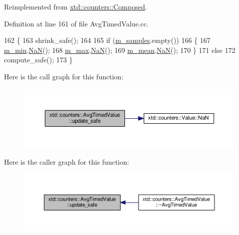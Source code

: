 Reimplemented from \hyperlink{classxtd_1_1counters_1_1Composed_ab6c13e603340cd00da4edc968d747c4d}{xtd\+::counters\+::\+Composed}.



Definition at line 161 of file Avg\+Timed\+Value.\+cc.


\begin{DoxyCode}
162 \{
163   shrink\_safe();
164 
165   \textcolor{keywordflow}{if} (\hyperlink{classxtd_1_1counters_1_1AvgTimedValue_af33c7f1f69e37ef49e4195de8f4ac6e2}{m\_samples}.empty())
166   \{
167     \hyperlink{classxtd_1_1counters_1_1AvgTimedValue_aeed066e7062c73d577033308bc0344bf}{m\_min}.\hyperlink{classxtd_1_1counters_1_1Value_ab206db077ef38ac776a7e64774f56f2b}{NaN}();
168     \hyperlink{classxtd_1_1counters_1_1AvgTimedValue_a90ef2640c6d711a3eef2585aaef50afb}{m\_max}.\hyperlink{classxtd_1_1counters_1_1Value_ab206db077ef38ac776a7e64774f56f2b}{NaN}();
169     \hyperlink{classxtd_1_1counters_1_1AvgTimedValue_ab0eb52c60a1fe28c6ea148270ca8cc74}{m\_mean}.\hyperlink{classxtd_1_1counters_1_1Value_ab206db077ef38ac776a7e64774f56f2b}{NaN}();
170   \}
171   \textcolor{keywordflow}{else}
172     compute\_safe();
173 \}
\end{DoxyCode}


Here is the call graph for this function\+:
\nopagebreak
\begin{figure}[H]
\begin{center}
\leavevmode
\includegraphics[width=350pt]{classxtd_1_1counters_1_1AvgTimedValue_a1430fd5ff91e960a251b0656c2b5c0ca_cgraph}
\end{center}
\end{figure}




Here is the caller graph for this function\+:
\nopagebreak
\begin{figure}[H]
\begin{center}
\leavevmode
\includegraphics[width=350pt]{classxtd_1_1counters_1_1AvgTimedValue_a1430fd5ff91e960a251b0656c2b5c0ca_icgraph}
\end{center}
\end{figure}




